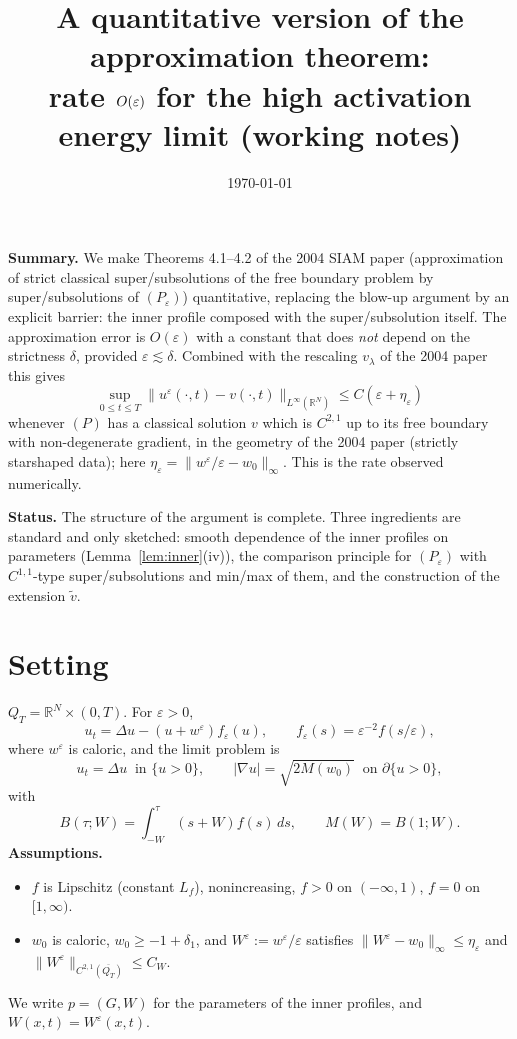 \documentclass[11pt]{amsart}
\title{A quantitative version of the approximation theorem:\\ rate $O(\ve)$ for the high activation energy limit (working notes)}
\date{\today}
\theoremstyle{definition}
\theoremstyle{remark}
\newcommand{\ve}{\varepsilon}
\newcommand{\R}{\mathbb{R}}
\begin{document}
\maketitle

\noindent\textbf{Summary.} We make Theorems 4.1--4.2 of the 2004 SIAM paper
(approximation of strict classical super/subsolutions of the free boundary
problem by super/subsolutions of $(P_\ve)$) quantitative, replacing the
blow-up argument by an explicit barrier: the inner profile composed with the
super/subsolution itself. The approximation error is $O(\ve)$ with a constant
that does \emph{not} depend on the strictness $\delta$, provided
$\ve\lesssim\delta$. Combined with the rescaling $v_\lambda$ of the 2004 paper
this gives
\[
\sup_{0\le t\le T}\|u^\ve(\cdot,t)-v(\cdot,t)\|_{L^\infty(\R^N)}\le C(\ve+\eta_\ve)
\]
whenever $(P)$ has a classical solution $v$ which is $C^{2,1}$ up to its free
boundary with non-degenerate gradient, in the geometry of the 2004 paper
(strictly starshaped data); here $\eta_\ve=\|w^\ve/\ve-w_0\|_\infty$. This is
the rate observed numerically.

\noindent\textbf{Status.} The structure of the argument is complete. Three
ingredients are standard and only sketched: smooth dependence of the inner
profiles on parameters (Lemma~\ref{lem:inner}(iv)), the comparison principle
for $(P_\ve)$ with $C^{1,1}$-type super/subsolutions and min/max of them, and
the construction of the extension $\tilde v$.

\section{Setting}

$Q_T=\R^N\times(0,T)$. For $\ve>0$,
\begin{equation}\label{eq:Pe}\tag{$P_\ve$}
u_t=\Delta u-(u+w^\ve)f_\ve(u),\qquad f_\ve(s)=\ve^{-2}f(s/\ve),
\end{equation}
where $w^\ve$ is caloric, and the limit problem is
\begin{equation}\label{eq:P}\tag{$P$}
u_t=\Delta u\ \text{ in }\{u>0\},\qquad |\nabla u|=\sqrt{2M(w_0)}\ \text{ on }\partial\{u>0\},
\end{equation}
with
\[
B(\tau;W)=\int_{-W}^{\tau}(s+W)f(s)\,ds,\qquad M(W)=B(1;W).
\]
\textbf{Assumptions.}
\begin{itemize}
\item[(F)] $f$ is Lipschitz (constant $L_f$), nonincreasing, $f>0$ on $(-\infty,1)$,
$f=0$ on $[1,\infty)$.
\item[(W)] $w_0$ is caloric, $w_0\ge-1+\delta_1$, and $W^\ve:=w^\ve/\ve$ satisfies
$\|W^\ve-w_0\|_\infty\le\eta_\ve$ and $\|W^\ve\|_{C^{2,1}(\overline{Q_T})}\le C_W$.
\end{itemize}
We write $p=(G,W)$ for the parameters of the inner profiles, and $W(x,t)=W^\ve(x,t)$.
\end{document}
